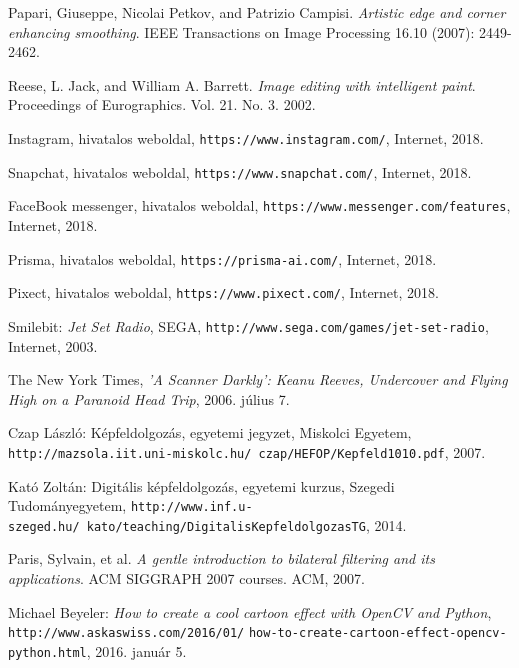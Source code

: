 
\begin{thebibliography}{x}

Papari, Giuseppe, Nicolai Petkov, and Patrizio Campisi. \emph{Artistic edge and corner enhancing smoothing}. IEEE Transactions on Image Processing 16.10 (2007): 2449-2462.

Reese, L. Jack, and William A. Barrett. \emph{Image editing with intelligent paint}. Proceedings of Eurographics. Vol. 21. No. 3. 2002.

Instagram, hivatalos weboldal, \texttt{https://www.instagram.com/}, Internet, 2018.

Snapchat, hivatalos weboldal, \texttt{https://www.snapchat.com/}, Internet, 2018.

FaceBook messenger, hivatalos weboldal, \texttt{https://www.messenger.com/features}, Internet, 2018.

Prisma, hivatalos weboldal, \texttt{https://prisma-ai.com/}, Internet, 2018.

Pixect, hivatalos weboldal, \texttt{https://www.pixect.com/}, Internet, 2018.

Smilebit: \emph{Jet Set Radio}, SEGA, \texttt{http://www.sega.com/games/jet-set-radio}, Internet, 2003.

The New York Times, \emph{'A Scanner Darkly': Keanu Reeves, Undercover and Flying High on a Paranoid Head Trip}, 2006. július 7.

Czap László: Képfeldolgozás, egyetemi jegyzet, Miskolci Egyetem, \\ \texttt{http://mazsola.iit.uni-miskolc.hu/~czap/HEFOP/Kepfeld1010.pdf}, 2007.

Kató Zoltán: Digitális képfeldolgozás, egyetemi kurzus, Szegedi Tudományegyetem, \texttt{http://www.inf.u-szeged.hu/~kato/teaching/DigitalisKepfeldolgozasTG}, 2014.

Paris, Sylvain, et al. \emph{A gentle introduction to bilateral filtering and its applications}. ACM SIGGRAPH 2007 courses. ACM, 2007.

 Michael Beyeler: \emph{How to create a cool cartoon effect with OpenCV and Python}, \texttt{http://www.askaswiss.com/2016/01/} \texttt{how-to-create-cartoon-effect-opencv-python.html}, 2016. január 5.


\end{thebibliography}
